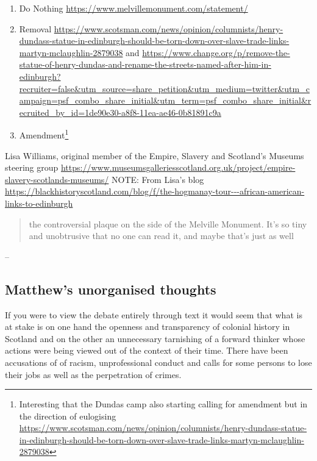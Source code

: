 \begin{enumerate}
    \item Do Nothing \url{https://www.melvillemonument.com/statement/}
    \item Removal \url{https://www.scotsman.com/news/opinion/columnists/henry-dundass-statue-in-edinburgh-should-be-torn-down-over-slave-trade-links-martyn-mclaughlin-2879038} and \url{https://www.change.org/p/remove-the-statue-of-henry-dundas-and-rename-the-streets-named-after-him-in-edinburgh?recruiter=false&utm_source=share_petition&utm_medium=twitter&utm_campaign=psf_combo_share_initial&utm_term=psf_combo_share_initial&recruited_by_id=1de90e30-a8f8-11ea-ae46-0b81891c9a}
    \item Amendment\footnote{Interesting that the Dundas camp also starting calling for amendment but in the direction of eulogising \url{https://www.scotsman.com/news/opinion/columnists/henry-dundass-statue-in-edinburgh-should-be-torn-down-over-slave-trade-links-martyn-mclaughlin-2879038}} \cite{esclr_2022}
\end{enumerate}


Lisa Williams, original member of the Empire, Slavery and Scotland's Museums steering group \url{https://www.museumsgalleriesscotland.org.uk/project/empire-slavery-scotlands-museums/}
NOTE: From Lisa's blog \url{https://blackhistoryscotland.com/blog/f/the-hogmanay-tour---african-american-links-to-edinburgh}

\begin{quotation}
    the controversial plaque on the side of the Melville Monument. It's so tiny and unobtrusive that no one can read it, and maybe that's just as well
\end{quotation}
\begin{flushright}
    -- \cite{williams_2025}
\end{flushright}


\subsection{Matthew's unorganised thoughts}

If you were to view the debate entirely through text it would seem that what is at stake is on one hand the openness and transparency of colonial history in Scotland and on the other an unnecessary tarnishing of a forward thinker whose actions were being viewed out of the context of their time. There have been accusations of of racism, unprofessional conduct and calls for some persons to lose their jobs as well as the perpetration of crimes.

